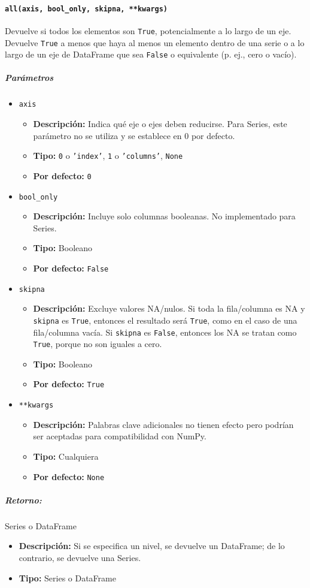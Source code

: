 \paragraph{\texttt{all(axis, bool\_only, skipna, **kwargs)}}
Devuelve si todos los elementos son \texttt{True}, potencialmente a lo largo de un eje. Devuelve \texttt{True} a menos que haya al menos un elemento dentro de una serie o a lo largo de un eje de DataFrame que sea \texttt{False} o equivalente (p. ej., cero o vacío).
\subparagraph{\textbf{Parámetros}}
\begin{itemize}
\item \texttt{axis}
\begin{itemize}
\item \textbf{Descripción:} Indica qué eje o ejes deben reducirse. Para Series, este parámetro no se utiliza y se establece en 0 por defecto.
\item \textbf{Tipo:} \texttt{0} o \texttt{'index'}, \texttt{1} o \texttt{'columns'}, \texttt{None}
\item \textbf{Por defecto:} \texttt{0}
\end{itemize}
\item \texttt{bool\_only}
\begin{itemize}
\item \textbf{Descripción:} Incluye solo columnas booleanas. No implementado para Series.
\item \textbf{Tipo:} Booleano
\item \textbf{Por defecto:} \texttt{False}
\end{itemize}
\item \texttt{skipna}
\begin{itemize}
\item \textbf{Descripción:} Excluye valores NA/nulos. Si toda la fila/columna es NA y \texttt{skipna} es \texttt{True}, entonces el resultado será \texttt{True}, como en el caso de una fila/columna vacía. Si \texttt{skipna} es \texttt{False}, entonces los NA se tratan como \texttt{True}, porque no son iguales a cero.
\item \textbf{Tipo:} Booleano
\item \textbf{Por defecto:} \texttt{True}
\end{itemize}
\item \texttt{**kwargs}
\begin{itemize}
\item \textbf{Descripción:} Palabras clave adicionales no tienen efecto pero podrían ser aceptadas para compatibilidad con NumPy.
\item \textbf{Tipo:} Cualquiera
\item \textbf{Por defecto:} \texttt{None}
\end{itemize}
\end{itemize}
\subparagraph{Retorno:} Series o DataFrame
\begin{itemize}
\item \textbf{Descripción:} Si se especifica un nivel, se devuelve un DataFrame; de lo contrario, se devuelve una Series.
\item \textbf{Tipo:} Series o DataFrame
\end{itemize}
